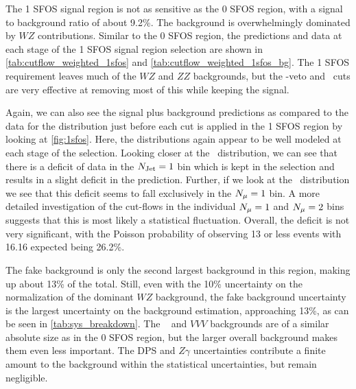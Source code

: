 The 1 SFOS signal region is not as sensitive as the 0 SFOS region, with 
a signal to background ratio of about 9.2\%.
The background is overwhelmingly dominated by $WZ$ contributions. 
Similar to the 0 SFOS region, the predictions and data
at each stage of the 1 SFOS signal region selection are shown in
\tab\ref{tab:cutflow_weighted_1sfos}
and 
\tab\ref{tab:cutflow_weighted_1sfos_bg}. 
The 1 SFOS requirement leaves much of the $WZ$ and $ZZ$ backgrounds,
but the \z-veto and \MET~cuts
are very effective at removing most of this while keeping the signal.


Again, we can also see the signal plus background predictions as 
compared to the data
for the distribution just before each cut is applied in 
the 1 SFOS region by looking at \fig\ref{fig:1sfos}. 
Here, the distributions again appear to be well modeled
at each stage of the selection.  Looking closer
at the \njet~distribution, we can see that there is a deficit
of data in the $N_{\textrm{Jet}}=1$ bin which is kept in the selection
and results in a slight deficit in the prediction. 
Further, if we look at the \nmu~distribution we see that
this deficit seems to fall exclusively in the $N_{\mu}=1$ bin.
A more detailed investigation of the cut-flows
in the individual $N_{\mu}=1$ and $N_{\mu}=2$ bins suggests that 
this is most likely a statistical fluctuation.
Overall, the deficit is not very significant, with the Poisson
probability of observing 13 or less events with 16.16 expected
being 26.2\%.


The fake background is only the second largest background in 
this region, making up about 13\% of the total. Still, even with 
the 10\% uncertainty on the normalization of the dominant $WZ$
background, the fake background uncertainty is the largest
uncertainty on the background estimation, approaching 13\%, as
can be seen in \tab\ref{tab:sys_breakdown}.
The \ttV~ and $VVV$ backgrounds are of a similar absolute size as in
the 0 SFOS region, but the larger overall background makes them
even less important. The DPS and $Z\gamma$ uncertainties
contribute a finite amount to the background within the statistical
uncertainties, but remain negligible.

%

